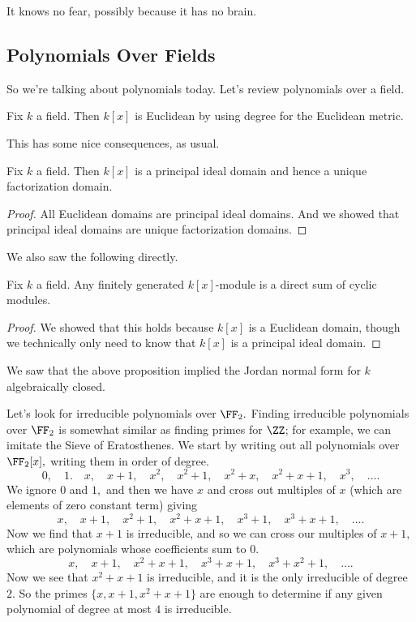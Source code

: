 \documentclass[../notes.tex]{subfiles}
\begin{document}
% 


















It knows no fear, possibly because it has no brain.

\subsection{Polynomials Over Fields}
So we're talking about polynomials today. Let's review polynomials over a field.
\begin{theorem}
	Fix $k$ a field. Then $k[x]$ is Euclidean by using degree for the Euclidean metric.
\end{theorem}
This has some nice consequences, as usual.
\begin{proposition}
	Fix $k$ a field. Then $k[x]$ is a principal ideal domain and hence a unique factorization domain.
\end{proposition}
\begin{proof}
	All Euclidean domains are principal ideal domains. And we showed that principal ideal domains are unique factorization domains.
\end{proof}
We also saw the following directly.
\begin{proposition}
	Fix $k$ a field. Any finitely generated $k[x]$-module is a direct sum of cyclic modules.
\end{proposition}
\begin{proof}
	We showed that this holds because $k[x]$ is a Euclidean domain, though we technically only need to know that $k[x]$ is a principal ideal domain.
\end{proof}
We saw that the above proposition implied the Jordan normal form for $k$ algebraically closed.
\begin{example}
	Let's look for irreducible polynomials over $\FF_2.$ Finding irreducible polynomials over $\FF_2$ is somewhat similar as finding primes for $\ZZ$; for example, we can imitate the Sieve of Eratosthenes. We start by writing out all polynomials over $\FF_2[x],$ writing them in order of degree.
	\[0,\quad1.\quad x,\quad x+1,\quad x^2,\quad x^2+1,\quad x^2+x,\quad x^2+x+1,\quad x^3,\quad\ldots.\]
	We ignore $0$ and $1,$ and then we have $\boxed{x}$ and cross out multiples of $x$ (which are elements of zero constant term) giving
	\[\boxed{x},\quad x+1,\quad x^2+1,\quad x^2+x+1,\quad x^3+1,\quad x^3+x+1,\quad\ldots.\]
	Now we find that $x+1$ is irreducible, and so we can cross our multiples of $x+1,$ which are polynomials whose coefficients sum to $0.$ 
	\[\boxed{x},\quad\boxed{x+1},\quad x^2+x+1,\quad x^3+x+1,\quad x^3+x^2+1,\quad\ldots.\]
	Now we see that $\boxed{x^2+x+1}$ is irreducible, and it is the only irreducible of degree $2.$ So the primes $\{x,x+1,x^2+x+1\}$ are enough to determine if any given polynomial of degree at most $4$ is irreducible.
\end{example}
\end{document}
